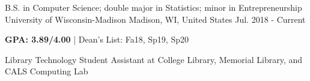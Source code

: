 

\begin{cventries}

  \cventry
  {B.S. in Computer Science; double major in Statistics; minor in Entrepreneurship} %
  {University of Wisconsin-Madison} %
  {Madison, WI, United States} %
  {Jul. 2018 - Current} %
  {
    \begin{cvitems} %
      \item {\textbf{GPA: 3.89/4.00} | Dean's List: Fa18, Sp19, Sp20}
      \item {Library Technology Student Assistant at College Library, Memorial Library, and CALS Computing Lab}
    \end{cvitems}
  }

\end{cventries}

